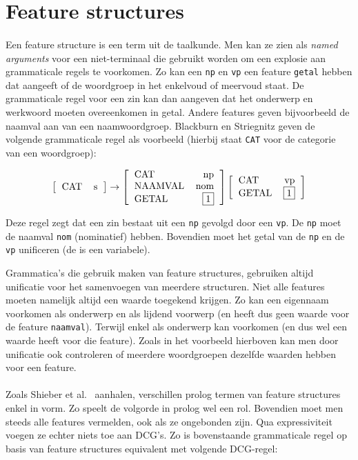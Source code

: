 \section{Feature structures}
\label{sec:featureStructures}

\paragraph{} Een feature structure is een term uit de taalkunde. Men kan ze zien als \textit{named arguments} voor een niet-terminaal die gebruikt worden om een explosie aan grammaticale regels te voorkomen. Zo kan een \texttt{np} en \texttt{vp} een feature \texttt{getal} hebben dat aangeeft of de woordgroep in het enkelvoud of meervoud staat. De grammaticale regel voor een zin kan dan aangeven dat het onderwerp en werkwoord moeten overeenkomen in getal. Andere features geven bijvoorbeeld de naamval aan van een naamwoordgroep. Blackburn en Striegnitz \cite{NLPCourse} geven de volgende grammaticale regel als voorbeeld (hierbij staat \texttt{CAT} voor de categorie van een woordgroep):

\[
  \fstructure{
    \feature{CAT}{s}
  }
  \rightarrow
  \fstructure{
    \feature{CAT}{np}
    \feature{NAAMVAL}{nom}
    \feature{GETAL}{\fvariable{1}}
  }
  \fstructure{
    \feature{CAT}{vp}
    \feature{GETAL}{\fvariable{1}}
  }
\]

Deze regel zegt dat een zin bestaat uit een \texttt{np} gevolgd door een \texttt{vp}. De \texttt{np} moet de naamval \texttt{nom} (nominatief) hebben. Bovendien moet het getal van de \texttt{np} en de \texttt{vp} unificeren (de  is een variabele).

Grammatica's die gebruik maken van feature structures, gebruiken altijd unificatie voor het samenvoegen van meerdere structuren. Niet alle features moeten namelijk altijd een waarde toegekend krijgen. Zo kan een eigennaam voorkomen als onderwerp en als lijdend voorwerp (en heeft dus geen waarde voor de feature \texttt{naamval}). Terwijl  enkel als onderwerp kan voorkomen (en dus wel een waarde heeft voor die feature). Zoals in het voorbeeld hierboven kan men door unificatie ook controleren of meerdere woordgroepen dezelfde waarden hebben voor een feature.

\paragraph{} Zoals Shieber et al.\ \cite{Shieber2003} aanhalen, verschillen prolog termen van feature structures enkel in vorm. Zo speelt de volgorde in prolog wel een rol. Bovendien moet men steeds alle features vermelden, ook als ze ongebonden zijn. Qua expressiviteit voegen ze echter niets toe aan DCG's. Zo is bovenstaande grammaticale regel op basis van feature structures equivalent met volgende DCG-regel:

